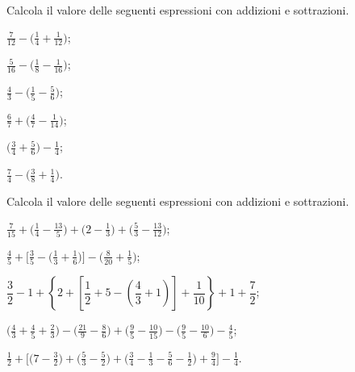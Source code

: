 \begin{esercizio}[\Ast]%
 \label{ese:3.131}
 Calcola il valore delle seguenti espressioni con addizioni e sottrazioni.
\begin{multicols}{2}
\begin{enumeratea}
\spazielenx
\item $\displaystyle{\frac{7}{12}-\bigg(\frac{1}{4}+\frac{1}{12}\bigg)}$;
\item $\displaystyle{\frac{5}{16}-\bigg(\frac{1}{8}-\frac{1}{16}\bigg)}$;
\item $\displaystyle{\frac{4}{3}-\bigg(\frac{1}{5}-\frac{5}{6}\bigg)}$;
\item $\displaystyle{\frac{6}{7}+\bigg(\frac{4}{7}-\frac{1}{14}\bigg)}$;
\item $\displaystyle{\bigg(\frac{3}{4}+\frac{5}{6}\bigg)-\frac{1}{4}}$;
\item $\displaystyle{\frac{7}{4}-\bigg(\frac{3}{8}+\frac{1}{4}\bigg)}$.
\end{enumeratea}
\end{multicols}
\end{esercizio}

\begin{esercizio}[\Ast]%
 \label{ese:3.132}
 Calcola il valore delle seguenti espressioni con addizioni e sottrazioni.
\begin{enumeratea}
\spazielenx
\item $\displaystyle{\frac{7}{15}+\bigg(\frac{1}{4}-\frac{13}{5}\bigg)+\bigg(2-\frac{1}{3}\bigg)+\bigg(\frac{5}{3}-\frac{13}{12}\bigg)}$;
\item $\displaystyle{\frac{4}{5}+\bigg[\frac{3}{5}-\bigg(\frac{1}{3}+\frac{1}{6}\bigg)\bigg]-\bigg(\frac{8}{20}+\frac{1}{5}\bigg)}$;
\item $ \dfrac{3}{2}-1+\left\lbrace 2+\left[\dfrac{1}{2}+5-\left(\dfrac{4}{3}+1 \right)  \right]+\dfrac{1}{10} \right\rbrace+1+\dfrac{7}{2}$;
\item $\displaystyle{\bigg(\frac{4}{3}+\frac{4}{5}+\frac{2}{3}\bigg)-\bigg(\frac{21}{9}-\frac{8}{6}\bigg)+\bigg(\frac{9}{5}-\frac{10}{15}\bigg)-\bigg(\frac{9}{5}-\frac{10}{6}\bigg)-\frac{4}{5}}$;
\item $\displaystyle{\frac{1}{2}+\bigg[\bigg(7-\frac{3}{2}\bigg)+\bigg(\frac{5}{3}-\frac{5}{2}\bigg)+\bigg(\frac{3}{4}-\frac{1}{3}-\frac{5}{6}-\frac{1}{2}\bigg)+\frac{9}{4}\bigg]-\frac{1}{4}}$.
\end{enumeratea}
\end{esercizio}


